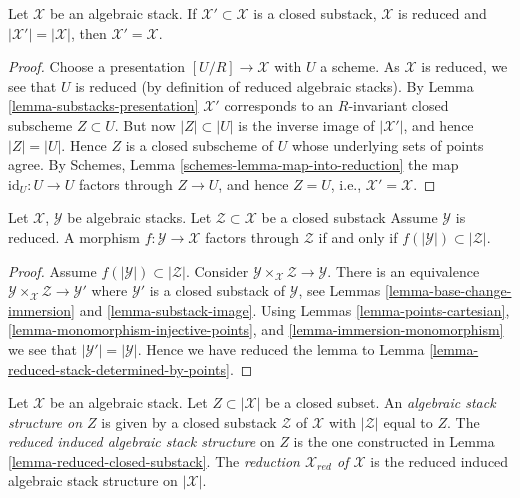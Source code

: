\begin{lemma}
\label{lemma-reduced-stack-determined-by-points}
Let $\mathcal{X}$ be an algebraic stack.
If $\mathcal{X}' \subset \mathcal{X}$
is a closed substack, $\mathcal{X}$ is reduced and
$|\mathcal{X}'| = |\mathcal{X}|$, then $\mathcal{X}' = \mathcal{X}$.
\end{lemma}

\begin{proof}
Choose a presentation $[U/R] \to \mathcal{X}$ with $U$ a scheme.
As $\mathcal{X}$ is reduced, we see that $U$ is reduced (by definition
of reduced algebraic stacks). By
Lemma \ref{lemma-substacks-presentation}
$\mathcal{X}'$ corresponds to an $R$-invariant closed subscheme $Z \subset U$.
But now $|Z| \subset |U|$ is the inverse image of $|\mathcal{X}'|$, and
hence $|Z| = |U|$. Hence $Z$ is a closed subscheme of $U$ whose underlying
sets of points agree. By
Schemes, Lemma \ref{schemes-lemma-map-into-reduction}
the map $\text{id}_U : U \to U$ factors through $Z \to U$, and hence
$Z = U$, i.e., $\mathcal{X}' = \mathcal{X}$.
\end{proof}

\begin{lemma}
\label{lemma-map-into-reduction}
Let $\mathcal{X}$, $\mathcal{Y}$ be algebraic stacks.
Let $\mathcal{Z} \subset \mathcal{X}$ be a closed substack
Assume $\mathcal{Y}$ is reduced.
A morphism $f : \mathcal{Y} \to \mathcal{X}$ factors through
$\mathcal{Z}$ if and only if
$f(|\mathcal{Y}|) \subset |\mathcal{Z}|$.
\end{lemma}

\begin{proof}
Assume $f(|\mathcal{Y}|) \subset |\mathcal{Z}|$. Consider
$\mathcal{Y} \times_{\mathcal{X}} \mathcal{Z} \to \mathcal{Y}$.
There is an equivalence
$\mathcal{Y} \times_{\mathcal{X}} \mathcal{Z} \to \mathcal{Y}'$
where $\mathcal{Y}'$ is a closed substack of $\mathcal{Y}$, see
Lemmas \ref{lemma-base-change-immersion} and
\ref{lemma-substack-image}.
Using
Lemmas \ref{lemma-points-cartesian},
\ref{lemma-monomorphism-injective-points}, and
\ref{lemma-immersion-monomorphism}
we see that $|\mathcal{Y}'| = |\mathcal{Y}|$. Hence we have
reduced the lemma to
Lemma \ref{lemma-reduced-stack-determined-by-points}.
\end{proof}

\begin{definition}
\label{definition-reduced-induced-stack}
Let $\mathcal{X}$ be an algebraic stack.
Let $Z \subset |\mathcal{X}|$ be a closed subset.
An {\it algebraic stack structure on $Z$} is given by a closed substack
$\mathcal{Z}$ of $\mathcal{X}$ with $|\mathcal{Z}|$ equal to $Z$.
The {\it reduced induced algebraic stack structure}
on $Z$ is the one constructed in
Lemma \ref{lemma-reduced-closed-substack}.
The {\it reduction $\mathcal{X}_{red}$ of $\mathcal{X}$}
is the reduced induced algebraic stack structure on $|\mathcal{X}|$.
\end{definition}

